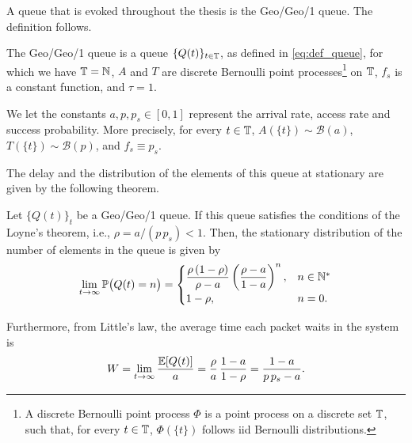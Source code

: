 A queue that is evoked throughout the thesis is the Geo/Geo/1 queue. The definition follows.
%
\begin{definition} \label{def:geo/geo/1}
    The Geo/Geo/1 queue is a queue $\{Q(t)\}_{t\in{\mathbb T}}$, as defined in \eqref{eq:def_queue}, for which we have ${\mathbb T}={\mathbb N}$, $A$ and $T$ are discrete Bernoulli point processes\footnote{A discrete Bernoulli point process $\Phi$ is a point process on a discrete set ${\mathbb T}$, such that, for every $t\in{\mathbb T}$, $\Phi(\{t\})$ follows iid Bernoulli distributions.} on ${\mathbb T}$, $f_s$ is a constant function, and $\tau = 1$.
    
    We let the constants $a,p,p_s\in[0,1]$ represent the arrival rate, access rate and success probability. More precisely, for every $t\in{\mathbb T}$, $A(\{t\})\sim\mathscr{B}(a)$, $T(\{t\})\sim\mathscr{B}(p)$, and $f_s \equiv p_s$.
\end{definition}

The delay and the distribution of the elements of this queue at stationary are given by the following theorem.

\begin{theorem} \label{th:geo/geo/1}
    Let $\{Q(t)\}_t$ be a \textrm{Geo/Geo/1} queue.
    If this queue satisfies the conditions of the Loyne's theorem, i.e., $\rho = a/(p\,p_s) < 1$.
    Then, the stationary distribution of the number of elements in the queue is given by
    \[  \lim_{t\to\infty} {\mathbb P}\big(Q(t)=n\big) =
        \begin{cases}
            \dfrac{\rho\,(1-\rho)}{\rho-a}\left(\dfrac{\rho-a}{1-a}\right)^n, & n\in{\mathbb N}^*\\
            1-\rho, & n = 0.
        \end{cases}
    \]
    
    Furthermore, from Little's law, the average time each packet waits in the system is
    \begin{align*}
        W = \lim_{t\to\infty}\frac{{\mathbb E}[Q(t)]}{a} = \frac{\rho}{a}\, \frac{1-a}{1-\rho} = \frac{1-a}{p\,p_s - a}.
    \end{align*}
\end{theorem}

